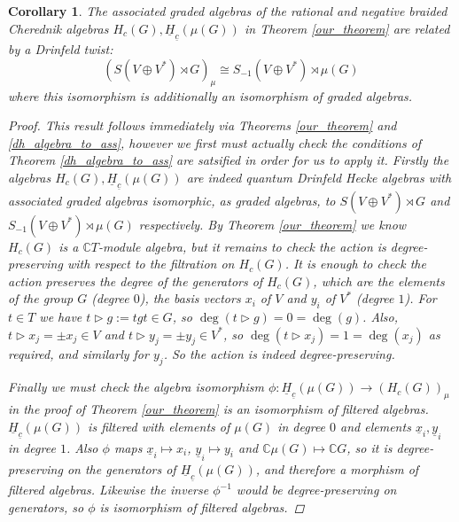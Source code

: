 \documentclass[10pt]{article}
\newcommand{\bb}{\medbreak}
\newcommand{\nt}{\noindent}
\newcommand{\Cc }{\mathbb{C}}
\newcommand{\rt}{\xrightarrow{}}
\newtheorem{cor}[lemma]{Corollary}
\theoremstyle{definition}
\begin{document}
\begin{cor}\label{cor_to_preprint_main_result} The associated graded algebras of the rational and negative braided Cherednik algebras $H_c(G),\underline{H}_{\underline{c}}(\mu(G))$ in Theorem \ref{our_theorem} are related by a Drinfeld twist:
\begin{equation}\label{twist_ass}(S(V\oplus V^*)\rtimes G)_\mu\cong S_{-1}(V\oplus V^*)\rtimes \mu(G)\end{equation}
where this isomorphism is additionally an isomorphism of graded algebras.
\begin{proof}
This result follows immediately via Theorems \ref{our_theorem} and \ref{dh_algebra_to_ass}, however we first must actually check the conditions of Theorem  \ref{dh_algebra_to_ass} are satsified in order for us to apply it. Firstly the algebras $H_c(G),\underline{H}_{\underline{c}}(\mu(G))$ are indeed quantum Drinfeld Hecke algebras with associated graded algebras isomorphic, as graded algebras, to $S(V\oplus V^*)\rtimes G$ and $S_{-1}(V\oplus V^*)\rtimes \mu(G)$ respectively. By Theorem \ref{our_theorem} we know $H_c(G)$ is a $\Cc  T$-module algebra, but it remains to check the action is degree-preserving with respect to the filtration on $H_c(G)$. It is enough to check the action preserves the degree of the generators of $H_c(G)$, which are the elements of the group $G$ (degree $0$), the basis vectors $x_i$ of $V$ and $y_i$ of $V^*$ (degree $1$). For $t\in T$ we have $t\rhd g:=tgt\in G$, so $\deg(t\rhd g)=0=\deg(g)$. Also, $t\rhd x_j=\pm x_j\in V$ and $t\rhd y_j=\pm y_j\in V^*$, so $\deg(t\rhd x_j)=1=\deg(x_j)$ as required, and similarly for $y_j$. So the action is indeed degree-preserving.\bb

\nt Finally we must check the algebra isomorphism $\phi: \underline{H}_{\underline{c}}(\mu(G))\rt (H_c(G))_\mu$ in the proof of Theorem \ref{our_theorem} is an isomorphism of filtered algebras. $\underline{H}_{\underline{c}}(\mu(G))$ is filtered with elements of $\mu(G)$ in degree $0$ and elements $\underline{x}_i,\underline{y}_i$ in degree $1$. Also $\phi$ maps $\underline{x}_i\mapsto x_i$, $\underline{y}_i\mapsto y_i$ and $\Cc  \mu(G)\mapsto \Cc  G$, so it is degree-preserving on the generators of $\underline{H}_{\underline{c}}(\mu(G))$, and therefore a morphism of filtered algebras. Likewise the inverse $\phi^{-1}$ would be degree-preserving on generators, so $\phi$ is isomorphism of filtered algebras.
\end{proof}
\end{cor}
\end{document}
